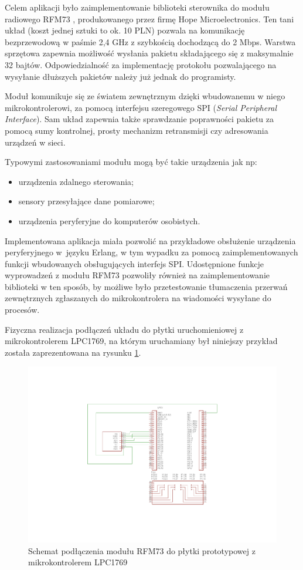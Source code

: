 Celem aplikacji było zaimplementowanie biblioteki sterownika do modułu radiowego RFM73 \cite{RFM73}, produkowanego przez firmę Hope Microelectronics.
Ten tani układ (koszt jednej sztuki to ok. 10 PLN) pozwala na komunikację bezprzewodową w paśmie 2,4 GHz z szybkością dochodzącą do 2 Mbps. Warstwa sprzętowa zapewnia możliwość wysłania pakietu składającego się z maksymalnie 32 bajtów.
Odpowiedzialność za implementację protokołu pozwalającego na wysyłanie dłuższych pakietów należy już jednak do programisty.

Moduł komunikuje się ze światem zewnętrznym dzięki wbudowanemu w niego mikrokontrolerowi, za pomocą interfejsu szeregowego SPI (\emph{Serial Peripheral Interface}). Sam układ zapewnia także sprawdzanie poprawności pakietu za pomocą sumy kontrolnej, prosty mechanizm retransmisji czy adresowania urządzeń w sieci.

Typowymi zastosowaniami modułu mogą być takie urządzenia jak np:
\begin{itemize}
\item urządzenia zdalnego sterowania;
\item sensory przesyłające dane pomiarowe;
\item urządzenia peryferyjne do komputerów osobistych.
\end{itemize}

Implementowana aplikacja miała pozwolić na przykładowe obsłużenie urządzenia peryferyjnego w~języku Erlang, w tym wypadku za pomocą zaimplementowanych funkcji wbudowanych obsługujących interfejs SPI.
Udostępnione funkcje wyprowadzeń z modułu RFM73 pozwoliły również na zaimplementowanie biblioteki w ten sposób, by możliwe było przetestowanie tłumaczenia przerwań zewnętrznych zgłaszanych do mikrokontrolera na wiadomości wysyłane do procesów.

Fizyczna realizacja podłączeń układu do płytki uruchomieniowej z mikrokontrolerem LPC1769, na którym uruchamiany był niniejszy przykład została zaprezentowana na rysunku \ref{fig:examplerfm}.

\begin{figure}[h]
\centerline{\includegraphics[scale=1, clip, trim=0 40mm 0 40mm]{example_rfm}}
\caption{Schemat podłączenia modułu RFM73 do płytki prototypowej z mikrokontrolerem LPC1769}
\label{fig:examplerfm}
\end{figure}


